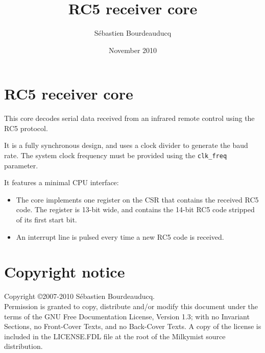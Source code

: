 \documentclass[a4paper,11pt]{article}
\title{RC5 receiver core}
\author{S\'ebastien Bourdeauducq}
\date{November 2010}
\begin{document}
\setlength{\parindent}{0pt}
\setlength{\parskip}{5pt}
\maketitle{}
\section{RC5 receiver core}
This core decodes serial data received from an infrared remote control using the RC5 protocol.

It is a fully synchronous design, and uses a clock divider to generate the baud rate. The system clock frequency must be provided using the \verb!clk_freq! parameter.

It features a minimal CPU interface:
\begin{itemize}
\item The core implements one register on the CSR that contains the received RC5 code. The register is 13-bit wide, and contains the 14-bit RC5 code stripped of its first start bit.
\item An interrupt line is pulsed every time a new RC5 code is received.
\end{itemize}

\section*{Copyright notice}
Copyright \copyright 2007-2010 S\'ebastien Bourdeauducq. \\
Permission is granted to copy, distribute and/or modify this document under the terms of the GNU Free Documentation License, Version 1.3; with no Invariant Sections, no Front-Cover Texts, and no Back-Cover Texts. A copy of the license is included in the LICENSE.FDL file at the root of the Milkymist source distribution.
\end{document}
